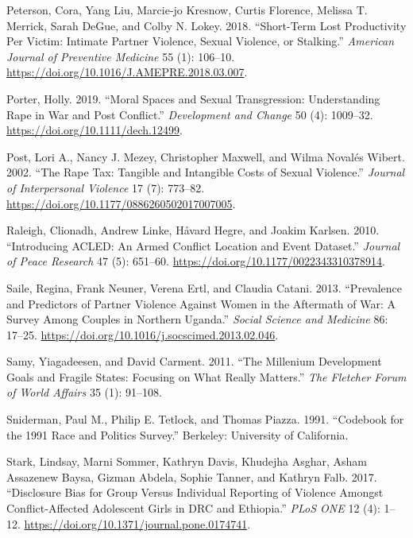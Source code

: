 \documentclass[
]{article}
\newlength{\cslhangindent}
\newenvironment{CSLReferences}[2] %
 {\begin{list}{}{%
  \setlength{\itemindent}{0pt}
  \setlength{\leftmargin}{0pt}
  \setlength{\parsep}{0pt}
  \ifodd #1
   \setlength{\leftmargin}{\cslhangindent}
   \setlength{\itemindent}{-1\cslhangindent}
  \fi
  \setlength{\itemsep}{#2\baselineskip}}}
 {\end{list}}
\begin{document}
\begin{CSLReferences}{1}{0}
Peterson, Cora, Yang Liu, Marcie-jo Kresnow, Curtis Florence, Melissa T.
Merrick, Sarah DeGue, and Colby N. Lokey. 2018. {``Short-Term {Lost
Productivity} Per {Victim}: {Intimate Partner Violence}, {Sexual
Violence}, or {Stalking}.''} \emph{American Journal of Preventive
Medicine} 55 (1): 106--10.
\url{https://doi.org/10.1016/J.AMEPRE.2018.03.007}.

Porter, Holly. 2019. {``Moral {Spaces} and {Sexual Transgression}:
{Understanding Rape} in {War} and {Post Conflict}.''} \emph{Development
and Change} 50 (4): 1009--32. \url{https://doi.org/10.1111/dech.12499}.

Post, Lori A., Nancy J. Mezey, Christopher Maxwell, and Wilma Novalés
Wibert. 2002. {``The {Rape Tax}: {Tangible} and {Intangible Costs} of
{Sexual Violence}.''} \emph{Journal of Interpersonal Violence} 17 (7):
773--82. \url{https://doi.org/10.1177/0886260502017007005}.

Raleigh, Clionadh, Andrew Linke, Håvard Hegre, and Joakim Karlsen. 2010.
{``Introducing {ACLED}: {An} Armed Conflict Location and Event
Dataset.''} \emph{Journal of Peace Research} 47 (5): 651--60.
\url{https://doi.org/10.1177/0022343310378914}.

Saile, Regina, Frank Neuner, Verena Ertl, and Claudia Catani. 2013.
{``Prevalence and Predictors of Partner Violence Against Women in the
Aftermath of War: {A} Survey Among Couples in {Northern Uganda}.''}
\emph{Social Science and Medicine} 86: 17--25.
\url{https://doi.org/10.1016/j.socscimed.2013.02.046}.

Samy, Yiagadeesen, and David Carment. 2011. {``The {Millenium
Development Goals} and {Fragile States}: {Focusing} on {What Really
Matters}.''} \emph{The Fletcher Forum of World Affairs} 35 (1): 91--108.

Sniderman, Paul M., Philip E. Tetlock, and Thomas Piazza. 1991.
{``Codebook for the 1991 {Race} and {Politics Survey}.''} {Berkeley}:
{University of California}.

Stark, Lindsay, Marni Sommer, Kathryn Davis, Khudejha Asghar, Asham
Assazenew Baysa, Gizman Abdela, Sophie Tanner, and Kathryn Falb. 2017.
{``Disclosure Bias for Group Versus Individual Reporting of Violence
Amongst Conflict-Affected Adolescent Girls in {DRC} and {Ethiopia}.''}
\emph{PLoS ONE} 12 (4): 1--12.
\url{https://doi.org/10.1371/journal.pone.0174741}.


\end{CSLReferences}
\end{document}
